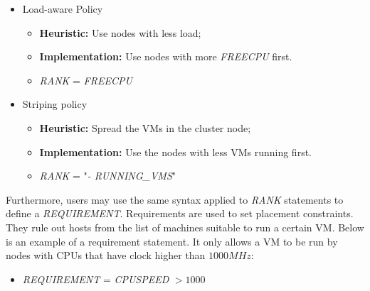 \begin{itemize}
 \item Load-aware Policy
 \begin{itemize}
   \item \textbf{Heuristic:} Use nodes with less load;
   \item \textbf{Implementation:} Use nodes with more \textit{FREECPU} first.
    \item \textit{RANK} = \textit{FREECPU}

 \end{itemize}

  \item Striping policy
  \begin{itemize}
   \item \textbf{Heuristic:} Spread the VMs in the cluster node;
   \item \textbf{Implementation:} Use the nodes with less VMs running first.
   \item \textit{RANK} = "\textit{- RUNNING\_VMS}"
  \end{itemize}

\end{itemize}

Furthermore, users may use the same syntax applied to \textit{RANK} statements to define a \textit{REQUIREMENT}. Requirements are used to set placement constraints. They rule out hosts from the list of machines suitable to run a certain VM. Below is an example of a requirement statement. It only allows  a VM to be run by nodes with CPUs that have clock higher than $1000 MHz$:
\begin{itemize}
 \item \textit{REQUIREMENT} = \textit{CPUSPEED} $> 1000$ 
\end{itemize}


